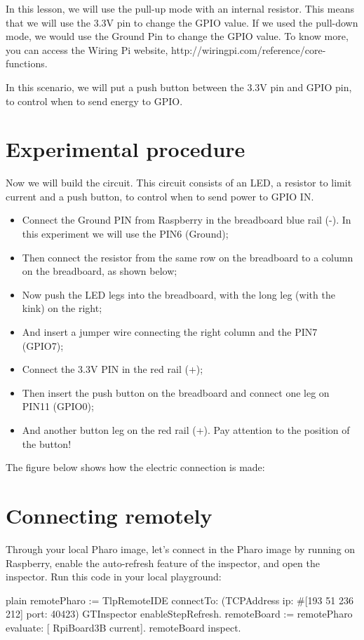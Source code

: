 \documentclass[10pt,twoside,english]{_support/latex/sbabook/sbabook}
\begin{document}
In this lesson, we will use the pull-up mode with an internal resistor. This means that we will use the 3.3V pin to change the GPIO value. If we used the pull-down mode, we would use the Ground Pin to change the GPIO value. To know more, you can access the Wiring Pi website, http://wiringpi.com/reference/core-functions.

In this scenario, we will put a push button between the 3.3V pin and GPIO pin, to control when to send energy to GPIO.
\section{Experimental procedure}
Now we will build the circuit. This circuit consists of an LED, a resistor to limit current and a push button, to control when to send power to GPIO IN.  

\begin{itemize}
\item Connect the Ground PIN from Raspberry in the breadboard blue rail (-). In this experiment we will use the PIN6 (Ground);
\item Then connect the resistor from the same row on the breadboard to a column on the breadboard, as shown below;
\item Now push the LED legs into the breadboard, with the long leg (with the kink) on the right;
\item And insert a jumper wire connecting the right column and the PIN7 (GPIO7);
\item Connect the 3.3V PIN in the red rail (+);
\item Then insert the push button on the breadboard and connect one leg on PIN11 (GPIO0);
\item And another button leg on the red rail (+). Pay attention to the position of the button!
\end{itemize}

The figure below shows how the electric connection is made:
\section{Connecting remotely}
Through your local Pharo image, let’s connect in the Pharo image by running on Raspberry, enable the auto-refresh feature of the inspector, and open the inspector.
Run this code in your local playground:

\begin{displaycode}{plain}
remotePharo := TlpRemoteIDE connectTo: (TCPAddress ip: #[193 51 236 212] port: 40423)
GTInspector enableStepRefresh.
remoteBoard := remotePharo evaluate: [ RpiBoard3B current].
remoteBoard inspect.
\end{displaycode}
\end{document}
